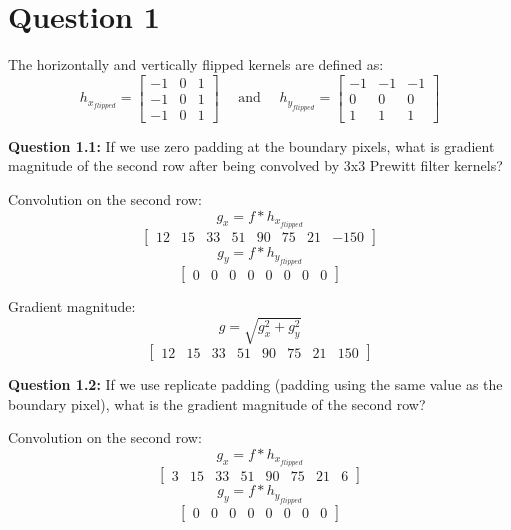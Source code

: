 \documentclass[12pt]{article}
\begin{document}
\maketitle

\section*{Question 1}

The horizontally and vertically flipped kernels are defined as:
$$
 h_{x_{flipped}} = \begin{bmatrix}
     -1 & 0 & 1 \\
     -1 & 0 & 1 \\
     -1 & 0 & 1
 \end{bmatrix} \quad \text{ and } \quad h_{y_{flipped}} = \begin{bmatrix}
    -1 & -1 & -1 \\
    0 & 0 & 0 \\
    1 & 1 & 1
\end{bmatrix} 
$$

\textbf{Question 1.1:} If we use zero padding at the boundary pixels, what is gradient magnitude of the second row
after being convolved by 3x3 Prewitt filter kernels?

Convolution on the second row:
$$
    g_x = f * h_{x_{flipped}} 
$$
$$
\begin{bmatrix}
    12 & 15 & 33 & 51 & 90 & 75 & 21 & -150
\end{bmatrix}
$$
$$
    g_y = f * h_{y_{flipped}} 
$$
$$
\begin{bmatrix}
    0 & 0 & 0 & 0 & 0 & 0 & 0 & 0
\end{bmatrix}
$$

Gradient magnitude:
$$
    g = \sqrt{g_x^2 + g_y^2}
$$
$$
\begin{bmatrix}
    12 & 15 & 33 & 51 & 90 & 75 & 21 & 150
\end{bmatrix}
$$

\textbf{Question 1.2:} If we use replicate padding (padding using the same value as the boundary pixel), what is the
gradient magnitude of the second row?

Convolution on the second row:
$$
    g_x = f * h_{x_{flipped}} 
$$
$$
\begin{bmatrix}
    3 & 15 & 33 & 51 & 90 & 75 & 21 & 6
\end{bmatrix}
$$
$$
    g_y = f * h_{y_{flipped}} 
$$
$$
\begin{bmatrix}
    0 & 0 & 0 & 0 & 0 & 0 & 0 & 0
\end{bmatrix}
$$
\end{document}
